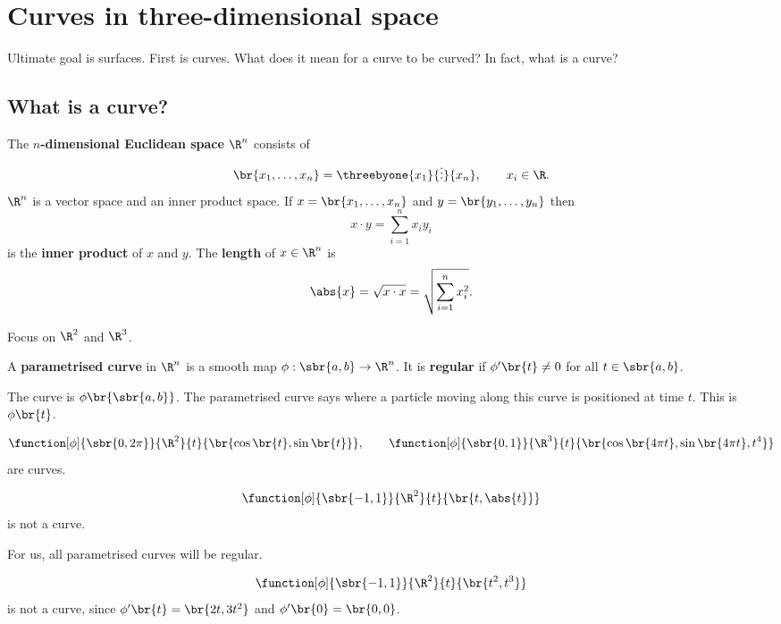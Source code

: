 \pagebreak

\section{Curves in three-dimensional space}

Ultimate goal is surfaces. First is curves. What does it mean for a curve to be curved? In fact, what is a curve?

\subsection{What is a curve?}

\begin{definition}
The \textbf{$ n $-dimensional Euclidean space} $ \R^n $ consists of
$$ \br{x_1, \dots, x_n} = \threebyone{x_1}{\vdots}{x_n}, \qquad x_i \in \R. $$
$ \R^n $ is a vector space and an inner product space. If $ x = \br{x_1, \dots, x_n} $ and $ y = \br{y_1, \dots, y_n} $ then
$$ x \cdot y = \sum_{i = 1}^n x_iy_i $$
is the \textbf{inner product} of $ x $ and $ y $. The \textbf{length} of $ x \in \R^n $ is
$$ \abs{x} = \sqrt{x \cdot x} = \sqrt{\sum_{i = 1}^n x_i^2}. $$
\end{definition}

Focus on $ \R^2 $ and $ \R^3 $.

\begin{definition}
A \textbf{parametrised curve} in $ \R^n $ is a smooth map $ \phi : \sbr{a, b} \to \R^n $. It is \textbf{regular} if $ \phi'\br{t} \ne 0 $ for all $ t \in \sbr{a, b} $.
\end{definition}

The curve is $ \phi\br{\sbr{a, b}} $. The parametrised curve says where a particle moving along this curve is positioned at time $ t $. This is $ \phi\br{t} $.

\begin{example*}
$$ \function[\phi]{\sbr{0, 2\pi}}{\R^2}{t}{\br{\cos\br{t}, \sin\br{t}}}, \qquad \function[\phi]{\sbr{0, 1}}{\R^3}{t}{\br{\cos\br{4\pi t}, \sin\br{4\pi t}, t^4}} $$
are curves.
\end{example*}

\begin{example*}
$$ \function[\phi]{\sbr{-1, 1}}{\R^2}{t}{\br{t, \abs{t}}} $$
is not a curve.
\end{example*}

For us, all parametrised curves will be regular.

\begin{example*}
$$ \function[\phi]{\sbr{-1, 1}}{\R^2}{t}{\br{t^2, t^3}} $$
is not a curve, since $ \phi'\br{t} = \br{2t, 3t^2} $ and $ \phi'\br{0} = \br{0, 0} $.
\end{example*}

